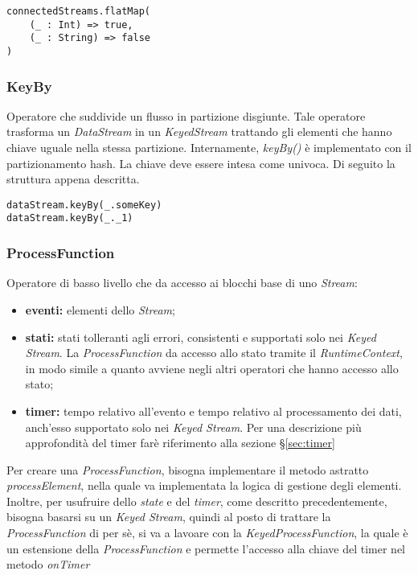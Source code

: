 \begin{verbatim}
connectedStreams.flatMap(
    (_ : Int) => true,
    (_ : String) => false
)
\end{verbatim}

\subsubsection{KeyBy}
Operatore che suddivide un flusso in partizione disgiunte. Tale operatore trasforma un \textit{DataStream} in un \textit{KeyedStream} trattando gli elementi che hanno chiave uguale nella stessa partizione. Internamente, \textit{keyBy()} è implementato con il partizionamento hash.
La chiave deve essere intesa come univoca.
Di seguito la struttura appena descritta.
\begin{verbatim}
dataStream.keyBy(_.someKey)
dataStream.keyBy(_._1)
\end{verbatim}

\subsubsection{ProcessFunction}
Operatore di basso livello che da accesso ai blocchi base di uno \textit{Stream}:
\begin{itemize}
	\item{\textbf{eventi:} elementi dello \textit{Stream};}
	\item{\textbf{stati:} stati tolleranti agli errori, consistenti e supportati solo nei \textit{Keyed Stream}. La \textit{ProcessFunction} da accesso allo stato tramite il \textit{RuntimeContext}, in modo simile a quanto avviene negli altri operatori che hanno accesso allo stato;}
	\item{\textbf{timer:} tempo relativo all'evento e tempo relativo al processamento dei dati, anch'esso supportato solo nei \textit{Keyed Stream}}. Per una descrizione più approfondità del timer farè riferimento alla sezione \S\ref{sec:timer}
\end{itemize}

Per creare una \textit{ProcessFunction}, bisogna implementare il metodo astratto \textit{processElement}, nella quale va implementata la logica di gestione degli elementi. Inoltre, per usufruire dello \textit{state} e del \textit{timer}, come descritto precedentemente, bisogna basarsi su un \textit{Keyed Stream}, quindi al posto di trattare la \textit{ProcessFunction} di per sè, si va a lavoare con la \textit{KeyedProcessFunction}, la quale è un estensione della \textit{ProcessFunction} e permette l'accesso alla chiave del timer nel metodo \textit{onTimer} 

